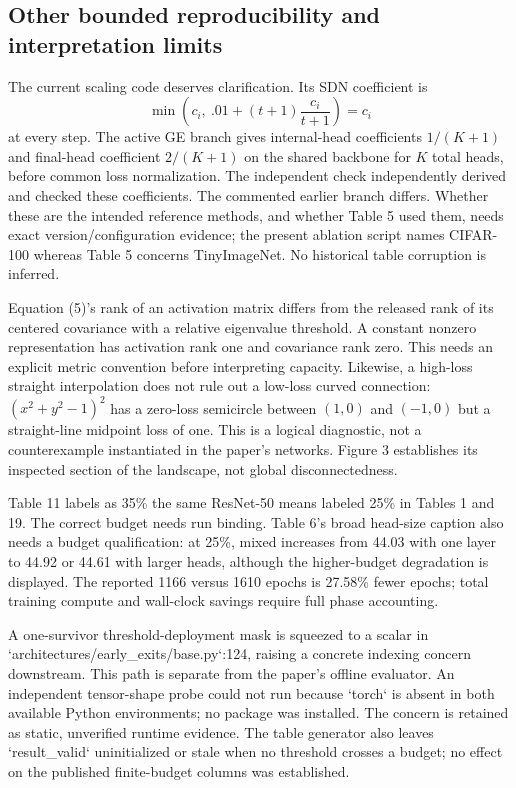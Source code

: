 \documentclass[10pt]{article}
\begin{document}
\subsection*{Other bounded reproducibility and interpretation limits}
The current scaling code deserves clarification. Its SDN coefficient is \[\min\left(c_i,\ .01+(t+1)\frac{c_i}{t+1}\right)=c_i\] at every step. The active GE branch gives internal-head coefficients \(1/(K+1)\) and final-head coefficient \(2/(K+1)\) on the shared backbone for \(K\) total heads, before common loss normalization. The independent check independently derived and checked these coefficients. The commented earlier branch differs. Whether these are the intended reference methods, and whether Table 5 used them, needs exact version/configuration evidence; the present ablation script names CIFAR-100 whereas Table 5 concerns TinyImageNet. No historical table corruption is inferred.\par
Equation (5)’s rank of an activation matrix differs from the released rank of its centered covariance with a relative eigenvalue threshold. A constant nonzero representation has activation rank one and covariance rank zero. This needs an explicit metric convention before interpreting capacity. Likewise, a high-loss straight interpolation does not rule out a low-loss curved connection: \((x^2+y^2-1)^2\) has a zero-loss semicircle between \((1,0)\) and \((-1,0)\) but a straight-line midpoint loss of one. This is a logical diagnostic, not a counterexample instantiated in the paper’s networks. Figure 3 establishes its inspected section of the landscape, not global disconnectedness.\par
Table 11 labels as 35\% the same ResNet-50 means labeled 25\% in Tables 1 and 19. The correct budget needs run binding. Table 6’s broad head-size caption also needs a budget qualification: at 25\%, mixed increases from 44.03 with one layer to 44.92 or 44.61 with larger heads, although the higher-budget degradation is displayed. The reported 1166 versus 1610 epochs is 27.58\% fewer epochs; total training compute and wall-clock savings require full phase accounting.\par
A one-survivor threshold-deployment mask is squeezed to a scalar in `architectures/early\_exits/base.py`:124, raising a concrete indexing concern downstream. This path is separate from the paper’s offline evaluator. An independent tensor-shape probe could not run because `torch` is absent in both available Python environments; no package was installed. The concern is retained as static, unverified runtime evidence. The table generator also leaves `result\_valid` uninitialized or stale when no threshold crosses a budget; no effect on the published finite-budget columns was established.\par
\end{document}
